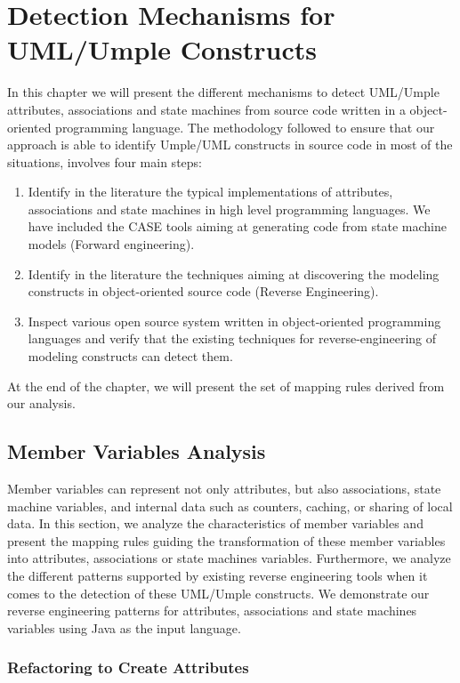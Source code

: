 \lhead{\emph{\leftmark}}  

\chapter{Detection Mechanisms for UML/Umple Constructs}
\label{chap:detections}
In this chapter we will present the different mechanisms to detect UML/Umple attributes, associations and state machines from source code written in a object-oriented programming language. The methodology followed to ensure that our approach is able to identify Umple/UML constructs in source code in most of the situations, involves four main steps:
\begin{enumerate}
\item 	Identify in the literature the typical implementations of attributes, associations and state machines in high level programming languages. We have included the CASE tools aiming at generating code from state machine models (Forward engineering).
\item 	Identify in the literature the techniques aiming at discovering the modeling constructs in object-oriented source code (Reverse Engineering).
\item 	Inspect various open source system written in object-oriented programming languages and verify that the existing techniques for reverse-engineering of modeling constructs can detect them.
\end{enumerate}
At the end of the chapter, we will present the set of mapping rules derived from our analysis. 


\section{Member Variables Analysis}
Member variables can represent not only attributes, but also associations, state machine variables, and internal data such as counters, caching, or sharing of local data. In this section, we analyze the characteristics of member variables and present the mapping rules guiding the transformation of
these member variables into attributes, associations or state machines variables. Furthermore, we analyze the different patterns supported by existing reverse engineering tools when it comes to the detection of these UML/Umple constructs. We demonstrate our reverse engineering patterns for attributes, associations and state machines variables using Java as the input language.  
\subsection{Refactoring to Create Attributes}

